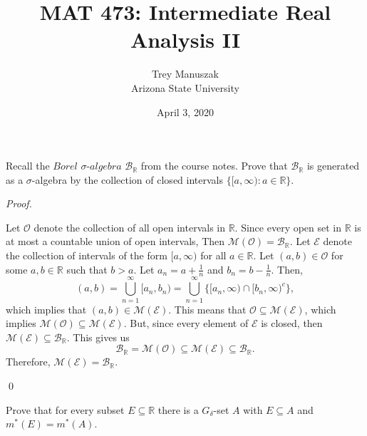 \documentclass[12pt]{article}
\title{MAT 473: Intermediate Real Analysis II}
\date{April 3, 2020}
\author{Trey Manuszak\\ Arizona State University}
\newenvironment{problem}[2][Problem]{\begin{trivlist}
\item[\hskip \labelsep {\bfseries #1}\hskip \labelsep {\bfseries
#2.}]}{\end{trivlist}}
\newenvironment{sol}
    {\emph{Proof.}
    }
    {
    \qed
    }
\begin{document}




\maketitle
\newpage





\begin{problem}{33}
Recall the $\textit{Borel } \sigma\textit{-algebra}$ $\mathcal{B}_\mathbb{R}$ from the course notes. Prove that $\mathcal{B}_\mathbb{R}$ is generated as a $\sigma$-algebra by the collection of closed intervals $\{[a,\infty) : a \in \mathbb{R}\}$.
\end{problem}
\begin{sol}
Let $\mathcal{O}$ denote the collection of all open intervals in $\mathbb{R}$. Since every open set in $\mathbb{R}$ is at most a countable union of open intervals, Then $\mathcal{M}(\mathcal{O}) = \mathcal{B}_\mathbb{R}$. Let $\mathcal{E}$ denote the collection of intervals of the form $[a,\infty)$ for all $a \in \mathbb{R}$. Let $(a,b) \in \mathcal{O}$ for some $a,b \in \mathbb{R}$ such that $b > a$. Let $a_n = a + \frac{1}{n}$ and $b_n = b - \frac{1}{n}$. Then, $$(a,b) = \bigcup_{n = 1}^\infty[a_n,b_n) = \bigcup_{n = 1}^\infty \{[a_n,\infty) \cap [b_n,\infty)^c\},$$ which implies that $(a,b) \in \mathcal{M}(\mathcal{E})$. This means that $\mathcal{O} \subseteq \mathcal{M}(\mathcal{E})$, which implies $\mathcal{M}(\mathcal{O}) \subseteq \mathcal{M}(\mathcal{E})$. But, since every element of $\mathcal{E}$ is closed, then $\mathcal{M}(\mathcal{E}) \subseteq \mathcal{B}_\mathbb{R}$. This gives us $$\mathcal{B}_\mathbb{R} = \mathcal{M}(\mathcal{O}) \subseteq \mathcal{M}(\mathcal{E}) \subseteq \mathcal{B}_\mathbb{R}.$$ Therefore, $\mathcal{M}(\mathcal{E}) = \mathcal{B}_\mathbb{R}$.
\end{sol}



\begin{problem}{34}
Prove that for every subset $E \subseteq \mathbb{R}$ there is a $G_\delta$-set $A$ with $E \subseteq A$ and $m^*(E) = m^*(A)$.
\end{problem}
\end{document}
